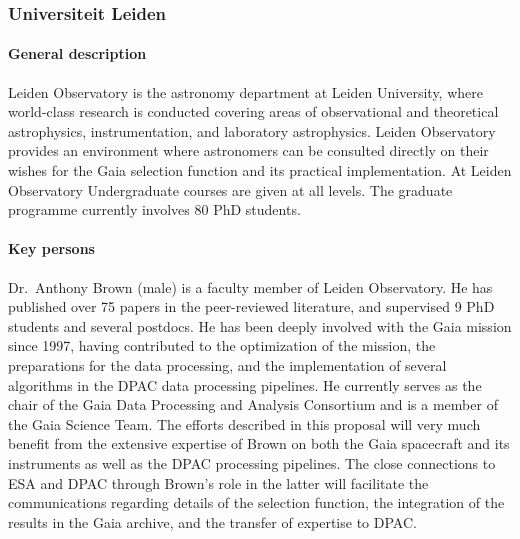 \subsubsection{Universiteit Leiden}
\label{sec:ulei}

\paragraph{General description}
Leiden Observatory is the astronomy department at Leiden University, where world-class research is conducted covering areas of observational and theoretical astrophysics, instrumentation, and laboratory astrophysics. 
Leiden Observatory provides an environment where astronomers can be consulted directly on their wishes for the Gaia selection function and its practical implementation. At Leiden Observatory Undergraduate courses are given at all levels. The graduate programme currently involves 80 PhD students.

\paragraph{Key persons}
Dr.~Anthony Brown (male) is a faculty member of Leiden Observatory. He has published over 75 papers in the peer-reviewed literature, and supervised 9 PhD students and several postdocs. He has been deeply involved with the Gaia mission since 1997, having contributed to the optimization of the mission, the preparations for the data processing, and the implementation of several algorithms in the DPAC data processing pipelines. He currently serves as the chair of the Gaia Data Processing and Analysis Consortium and is a member of the Gaia Science Team. The efforts described in this proposal will very much benefit from the extensive expertise of Brown on both the Gaia spacecraft and its instruments as well as the DPAC processing pipelines. The close connections to ESA and DPAC through Brown's role in the latter will facilitate the communications regarding details of the selection function, the integration of the results in the Gaia archive, and the transfer of expertise to DPAC.

